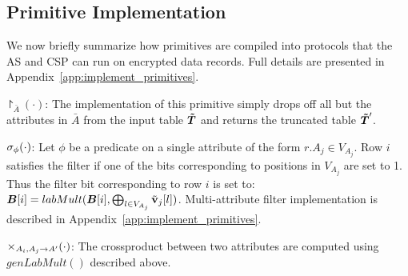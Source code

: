  

\subsection{Primitive Implementation}
We now briefly summarize how \system primitives are compiled into protocols that the \textsf{AS} and \textsf{CSP} can run on encrypted data records. Full details are presented in Appendix~\ref{app:implement_primitives}.

 $\project_{\bar{A}}(\cdot)$: The implementation of this primitive simply drops off all but the attributes in $\bar{A}$ from the input table $\boldsymbol{\tilde{T}}$ and returns the truncated table $\boldsymbol{\tilde{T}}'$.

 $\sigma_{\phi}(\cdot)$: Let $\phi$ be a predicate on a single attribute of the form $r.A_j \in V_{A_j}$. Row $i$ satisfies the filter if one of the bits corresponding to positions in $V_{A_j}$ are set to 1. Thus the filter bit corresponding to row $i$ is set to: $\boldsymbol{B}[i] = labMult(\boldsymbol{B}[i], \bigoplus_{l\in V_{A_j}}\tilde{\bf{v}}_j[l])$. Multi-attribute filter implementation is described in Appendix~\ref{app:implement_primitives}.

 $\times_{A_i,A_j\rightarrow A'}(\cdot)$: The crossproduct between two attributes are computed using $genLabMult()$ described above.

